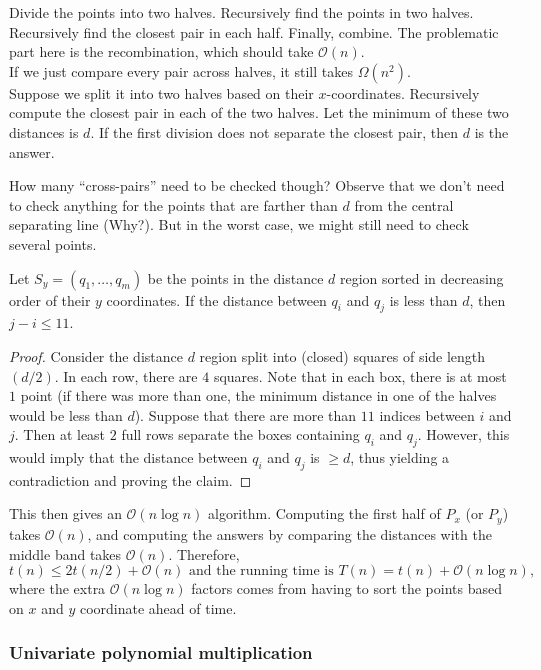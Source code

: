 Divide the points into two halves. Recursively find the points in two halves. Recursively find the closest pair in each half. Finally, combine. The problematic part here is the recombination, which should take $\mathcal{O}(n)$.\\
If we just compare every pair across halves, it still takes $\Omega(n^2)$.\\

Suppose we split it into two halves based on their $x$-coordinates. Recursively compute the closest pair in each of the two halves. Let the minimum of these two distances is $d$. If the first division does not separate the closest pair, then $d$ is the answer.

How many ``cross-pairs'' need to be checked though? Observe that we don't need to check anything for the points that are farther than $d$ from the central separating line (Why?). But in the worst case, we might still need to check several points.

\begin{lemma}
	Let $S_y=(q_1,\ldots,q_m)$ be the points in the distance $d$ region sorted in decreasing order of their $y$ coordinates. If the distance between $q_i$ and $q_j$ is less than $d$, then $j-i\leq 11$.
\end{lemma}
\begin{proof}
	Consider the distance $d$ region split into (closed) squares of side length $(d/2)$. In each row, there are $4$ squares. Note that in each box, there is at most $1$ point (if there was more than one, the minimum distance in one of the halves would be less than $d$). Suppose that there are more than $11$ indices between $i$ and $j$. Then at least $2$ full rows separate the boxes containing $q_i$ and $q_j$. However, this would imply that the distance between $q_i$ and $q_j$ is $\geq d$, thus yielding a contradiction and proving the claim.
\end{proof}

This then gives an $\mathcal{O}(n\log n)$ algorithm. Computing the first half of $P_x$ (or $P_y$) takes $\mathcal{O}(n)$, and computing the answers by comparing the distances with the middle band takes $\mathcal{O}(n)$. Therefore, 
\[ t(n) \leq 2t(n/2) + \mathcal{O}(n)\text{ and the running time is }T(n)=t(n)+\mathcal{O}(n\log n), \]
where the extra $\mathcal{O}(n\log n)$ factors comes from having to sort the points based on $x$ and $y$ coordinate ahead of time.

\subsubsection{Univariate polynomial multiplication}

